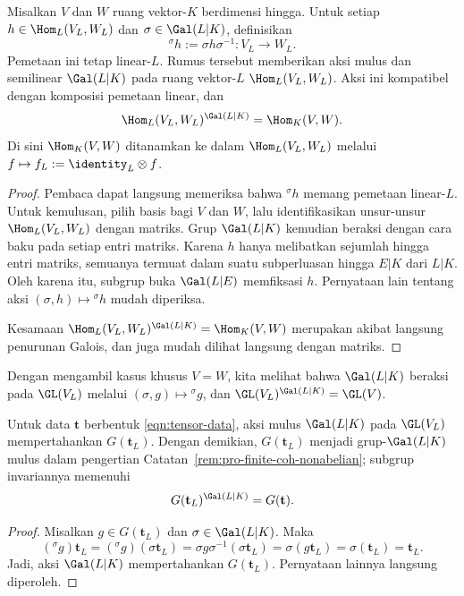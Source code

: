 \begin{lemma}
	Misalkan $V$ dan $W$ ruang vektor-$K$ berdimensi hingga. Untuk setiap
	$h\in\Hom_L(V_L,W_L)$ dan $\sigma\in\Gal(L|K)$, definisikan
	\[
	{}^\sigma h:=\sigma h\sigma^{-1}:V_L\to W_L.
	\]
	Pemetaan ini tetap linear-$L$. Rumus tersebut memberikan aksi mulus dan
	semilinear $\Gal(L|K)$ pada ruang vektor-$L$
	$\Hom_L(V_L,W_L)$. Aksi ini kompatibel dengan komposisi pemetaan linear,
	dan
	\[
	\Hom_L(V_L,W_L)^{\Gal(L|K)}=\Hom_K(V,W).
	\]
	Di sini $\Hom_K(V,W)$ ditanamkan ke dalam $\Hom_L(V_L,W_L)$ melalui
	$f\mapsto f_L:=\identity_L\otimes f$.
\end{lemma}
\begin{proof}
	Pembaca dapat langsung memeriksa bahwa ${}^\sigma h$ memang pemetaan
	linear-$L$. Untuk kemulusan, pilih basis bagi $V$ dan $W$, lalu
	identifikasikan unsur-unsur $\Hom_L(V_L,W_L)$ dengan matriks. Grup
	$\Gal(L|K)$ kemudian beraksi dengan cara baku pada setiap entri matriks.
	Karena $h$ hanya melibatkan sejumlah hingga entri matriks, semuanya
	termuat dalam suatu subperluasan hingga $E|K$ dari $L|K$. Oleh karena itu,
	subgrup buka $\Gal(L|E)$ memfiksasi $h$. Pernyataan lain tentang aksi
	$(\sigma,h)\mapsto{}^\sigma h$ mudah diperiksa.

	Kesamaan
	$\Hom_L(V_L,W_L)^{\Gal(L|K)}=\Hom_K(V,W)$ merupakan akibat langsung
	penurunan Galois, dan juga mudah dilihat langsung dengan matriks.
\end{proof}

Dengan mengambil kasus khusus $V=W$, kita melihat bahwa $\Gal(L|K)$ beraksi
pada $\GL(V_L)$ melalui $(\sigma,g)\mapsto{}^\sigma g$, dan
$\GL(V_L)^{\Gal(L|K)}=\GL(V)$.

\begin{lemma}
	Untuk data $\mathbf{t}$ berbentuk \eqref{eqn:tensor-data}, aksi mulus
	$\Gal(L|K)$ pada $\GL(V_L)$ mempertahankan $G(\mathbf{t}_L)$. Dengan
	demikian, $G(\mathbf{t}_L)$ menjadi grup-$\Gal(L|K)$ mulus dalam
	pengertian Catatan~\ref{rem:pro-finite-coh-nonabelian}; subgrup invariannya
	memenuhi
	\[
	G(\mathbf{t}_L)^{\Gal(L|K)}=G(\mathbf{t}).
	\]
\end{lemma}
\begin{proof}
	Misalkan $g\in G(\mathbf{t}_L)$ dan $\sigma\in\Gal(L|K)$. Maka
	\[
	({}^\sigma g)\mathbf{t}_L
	=({}^\sigma g)(\sigma\mathbf{t}_L)
	=\sigma g\sigma^{-1}(\sigma\mathbf{t}_L)
	=\sigma(g\mathbf{t}_L)
	=\sigma(\mathbf{t}_L)
	=\mathbf{t}_L.
	\]
	Jadi, aksi $\Gal(L|K)$ mempertahankan $G(\mathbf{t}_L)$. Pernyataan
	lainnya langsung diperoleh.
\end{proof}

